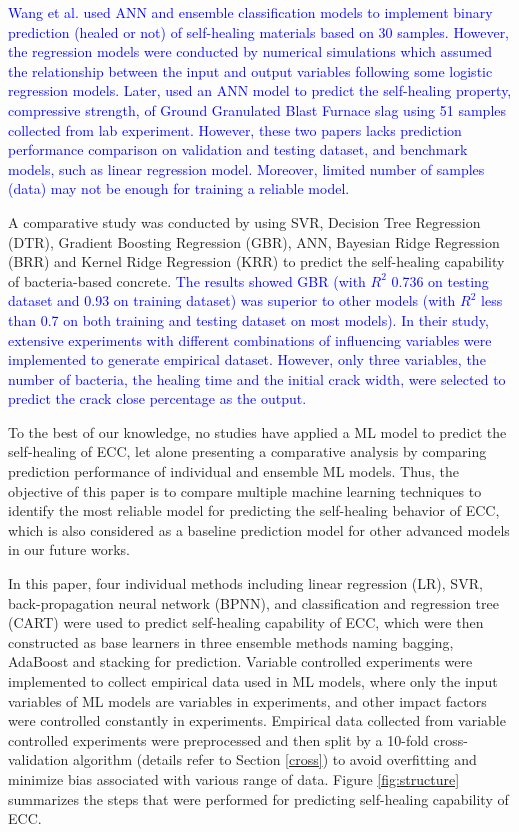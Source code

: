 \documentclass[11pt]{article}
\begin{document}
	\textcolor{blue}{
	Wang et al. \cite{wang2019towards} used ANN and ensemble classification models to implement binary prediction (healed or not)	of self-healing materials based on 30 samples. However, the regression models were conducted by numerical simulations which assumed the relationship between the input and output variables following some logistic regression models. Later, \cite{chaitanya2020prediction} used an ANN model to predict the self-healing property, compressive strength, of Ground Granulated Blast Furnace slag using 51 samples collected from lab experiment. However, these two papers lacks prediction performance comparison on validation and testing dataset, and benchmark models, such as linear regression model. Moreover, limited number of samples (data) may not be enough for training a reliable model.}	 
		 
	A comparative study was conducted by \cite{zhuang2019prediction} using SVR, Decision Tree Regression (DTR), Gradient Boosting Regression (GBR), ANN, Bayesian Ridge Regression (BRR) and Kernel Ridge Regression (KRR) to predict the self-healing capability of bacteria-based concrete. \textcolor{blue}{The results showed GBR (with $R^2$ 0.736 on testing dataset and 0.93 on training dataset) was superior to other models (with $R^2$ less than 0.7 on both training and testing dataset on most models). In their study, extensive experiments with different combinations of influencing variables were implemented to generate empirical dataset. However, only three variables, the number of bacteria, the healing time and the initial crack width, were selected to predict the crack close percentage as the output.  }
	
	To the best of our knowledge, no studies have applied a ML model to predict the self-healing of ECC, let alone presenting a comparative analysis by comparing prediction performance of individual and ensemble ML models. Thus, the objective of this paper is to compare multiple machine learning techniques to identify the most reliable model for predicting the self-healing behavior of ECC, which is also considered as a baseline prediction model for other advanced models in our future works. 

	
	In this paper, four individual methods including linear regression (LR), SVR, back-propagation neural network (BPNN), and classification and regression tree (CART) were used to predict self-healing capability of ECC, which were then constructed as base learners in three ensemble methods naming bagging, AdaBoost and stacking for prediction. Variable controlled experiments were implemented to collect empirical data used in ML models, where only the input variables of ML models are variables in experiments, and other impact factors were controlled constantly in experiments. Empirical data collected from variable controlled experiments were preprocessed and then split by a 10-fold cross-validation algorithm (details refer to Section \ref{cross}) to avoid overfitting and minimize bias associated with various range of data. Figure \ref{fig:structure} summarizes the steps that were performed for predicting self-healing capability of ECC. 
	
\end{document}
